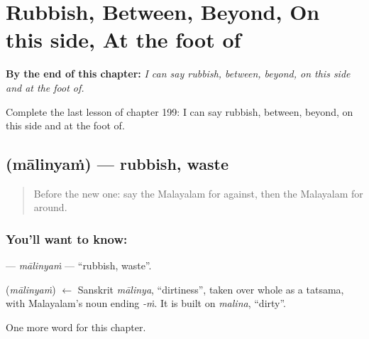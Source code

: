 
\chapter{Rubbish, Between, Beyond, On this side, At the foot of}
\label{ch:ml-rubbish-between-beyond-on-this-side-at-the-foot-of}

\begin{chapteropening}
\textbf{By the end of this chapter:} \emph{I can say rubbish, between, beyond, on this side and at the foot of.}

Complete the last lesson of chapter 199: I can say rubbish, between, beyond, on this side and at the foot of.
\end{chapteropening}

\section[\texorpdfstring{\ml{മാലിന്യം} (mālinyaṁ)}{മാലിന്യം (mālinyaṁ)}]{ (mālinyaṁ) — rubbish, waste}

\label{lesson:ML-C199-malinyam}



\begin{quote}
Before the new one: say the Malayalam for against, then the Malayalam for around.
\end{quote}

\subsection*{You'll want to know: }
\textbf{} — \emph{mālinyaṁ} — \textquotedblleft{}rubbish, waste\textquotedblright{}.

\begin{cousinweb}
\textbf{} (\emph{mālinyaṁ}) $\leftarrow$ Sanskrit \emph{mālinya}, \textquotedblleft{}dirtiness\textquotedblright{}, taken over whole as a tatsama, with Malayalam's noun ending \emph{-ṁ}. It is built on \emph{malina}, \textquotedblleft{}dirty\textquotedblright{}.
\end{cousinweb}

\begin{grammarlens}[title={What you've built}]
One more word for this chapter.
\end{grammarlens}

